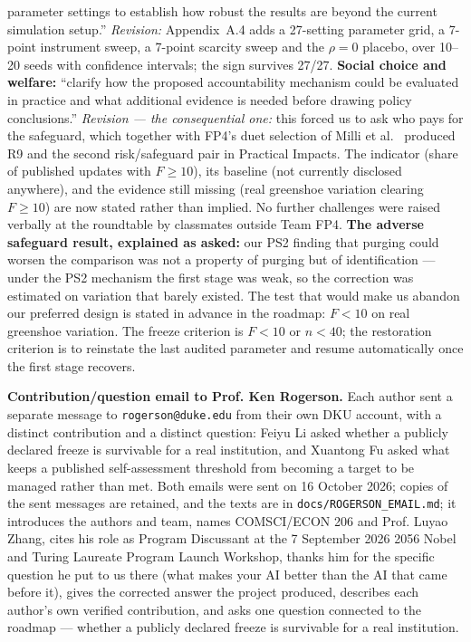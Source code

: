 parameter settings to establish how robust the results are beyond the current simulation setup.'' \emph{Revision:} Appendix~A.4 adds a 27-setting parameter grid, a 7-point instrument sweep, a 7-point scarcity sweep and the $\rho=0$ placebo, over 10--20 seeds with confidence intervals; the sign survives 27/27. \textbf{Social choice and welfare:} ``clarify how the proposed accountability mechanism could be evaluated in practice and what additional evidence is needed before drawing policy conclusions.'' \emph{Revision --- the consequential one:} this forced us to ask who pays for the safeguard, which together with FP4's duet selection of Milli et al.~\cite{milli2019} produced R9 and the second risk/safeguard pair in Practical Impacts. The indicator (share of published updates with $F\ge10$), its baseline (not currently disclosed anywhere), and the evidence still missing (real greenshoe variation clearing $F\ge10$) are now stated rather than implied. No further challenges were raised verbally at the roundtable by classmates outside Team FP4. \textbf{The adverse safeguard result, explained as asked:} our PS2 finding that purging could worsen the comparison was not a property of purging but of identification --- under the PS2 mechanism the first stage was weak, so the correction was estimated on variation that barely existed. The test that would make us abandon our preferred design is stated in advance in the roadmap: $F<10$ on real greenshoe variation. The freeze criterion is $F<10$ or $n<40$; the restoration criterion is to reinstate the last audited parameter and resume automatically once the first stage recovers.

\textbf{Contribution/question email to Prof. Ken Rogerson.} Each author sent a separate message to \texttt{rogerson@duke.edu} from their own DKU account, with a distinct contribution and a distinct question: Feiyu Li asked whether a publicly declared freeze is survivable for a real institution, and Xuantong Fu asked what keeps a published self-assessment threshold from becoming a target to be managed rather than met. Both emails were sent on 16 October 2026; copies of the sent messages are retained, and the texts are in \texttt{docs/ROGERSON\_EMAIL.md}; it introduces the authors and team, names COMSCI/ECON 206 and Prof. Luyao Zhang, cites his role as Program Discussant at the 7 September 2026 2056 Nobel and Turing Laureate Program Launch Workshop, thanks him for the specific question he put to us there (what makes your AI better than the AI that came before it), gives the corrected answer the project produced, describes each author's own verified contribution, and asks one question connected to the roadmap --- whether a publicly declared freeze is survivable for a real institution.

